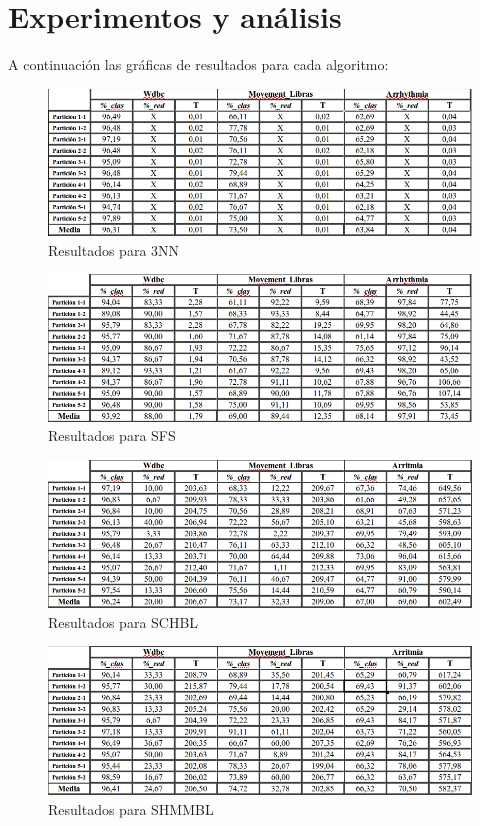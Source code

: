 \section{Experimentos y análisis}
A continuación las gráficas de resultados para cada algoritmo:
\begin{figure} [H]
\centering
\includegraphics[width=1.0\linewidth]{3NN}
\caption{Resultados para 3NN}
\label{fig:3NN}
\end{figure}

\begin{figure} [H]
\centering
\includegraphics[width=1.0\linewidth]{SFS}
\caption{Resultados para SFS}
\label{fig:SFS}
\end{figure}

\begin{figure} [H]
\centering
\includegraphics[width=1.0\linewidth]{SCHBL}
\caption{Resultados para SCHBL}
\label{fig:SCHBL}
\end{figure}

\begin{figure} [H]
\centering
\includegraphics[width=1.0\linewidth]{SHMMBL}
\caption{Resultados para SHMMBL}
\label{fig:SHMMBL}
\end{figure}

